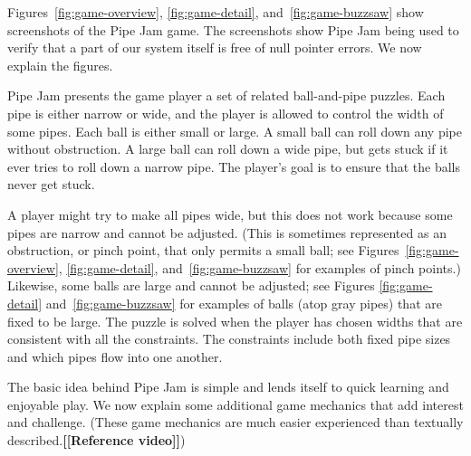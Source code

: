 \documentclass{sig-alternate}
\newcommand{\todo}[1]{{\color{red}\bfseries [[#1]]}}
\begin{document}
Figures~\ref{fig:game-overview}, \ref{fig:game-detail},
and~\ref{fig:game-buzzsaw} show screenshots of the Pipe Jam game.  The
screenshots show Pipe Jam being used to verify that a part of our system
itself is free of null pointer errors.  We now explain the figures.

Pipe Jam presents the game player a set of related ball-and-pipe
puzzles.  Each pipe is either narrow or wide, and the player is
allowed to control the width of some pipes.  Each ball is either small
or large.  A small ball can roll down any pipe without obstruction.  A
large ball can roll down a wide pipe, but gets stuck if it ever tries
to roll down a narrow pipe.  The player's goal is to ensure that the
balls never get stuck.

A player might try to make all pipes wide, but this does not work
because some pipes are narrow and cannot be adjusted.  (This is
sometimes represented as an obstruction, or pinch point, that only
permits a small ball; see Figures~\ref{fig:game-overview},
\ref{fig:game-detail}, and~\ref{fig:game-buzzsaw} for examples of
pinch points.)  Likewise, some balls are large and cannot be adjusted;
see Figures \ref{fig:game-detail} and~\ref{fig:game-buzzsaw} for
examples of balls (atop gray pipes) that are fixed to be large.  The
puzzle is solved when the player has chosen widths that are consistent
with all the constraints.  The constraints include both fixed pipe sizes
and which pipes
flow into one another.

The basic idea behind Pipe Jam is simple and lends itself to quick
learning and enjoyable play.  We now explain some additional game
mechanics that add interest and challenge.  (These game mechanics are
much easier experienced than textually described.\todo{Reference video})
\end{document}
